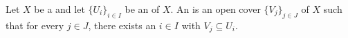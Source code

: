\begin{definition} \label{definition:open_refinement_of_an_open_cover_of_a_topological_space}
    Let $X$ be a  and let $\{U_i\}_{i \in I}$ be an  of $X$. 
    An  is an open cover $\{V_j\}_{j \in J}$ of $X$ such that for every $j \in J$, there exists an $i \in I$ with $V_j \subseteq U_i$.
\end{definition}